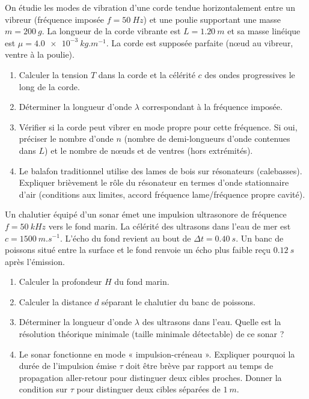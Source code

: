 \documentclass[11pt]{article}
\begin{document}
\begin{exercice}
On étudie les modes de vibration d'une corde tendue horizontalement entre un vibreur (fréquence imposée $f = \SI{50}{Hz}$) et une poulie supportant une masse $m = \SI{200}{g}$. La longueur de la corde vibrante est $L = \SI{1,20}{m}$ et sa masse linéique est $\mu = \SI{4,0e-3}{kg.m^{-1}}$. La corde est supposée parfaite (nœud au vibreur, ventre à la poulie).
\begin{enumerate}
    \item Calculer la tension $T$ dans la corde et la célérité $c$ des ondes progressives le long de la corde.
    \item Déterminer la longueur d'onde $\lambda$ correspondant à la fréquence imposée.
    \item Vérifier si la corde peut vibrer en mode propre pour cette fréquence. Si oui, préciser le nombre d'onde $n$ (nombre de demi-longueurs d'onde contenues dans $L$) et le nombre de nœuds et de ventres (hors extrémités).
    \item Le balafon traditionnel utilise des lames de bois sur résonateurs (calebasses). Expliquer brièvement le rôle du résonateur en termes d'onde stationnaire d'air (conditions aux limites, accord fréquence lame/fréquence propre cavité).
\end{enumerate}
\end{exercice}

\begin{exercice}
Un chalutier équipé d'un sonar émet une impulsion ultrasonore de fréquence $f = \SI{50}{kHz}$ vers le fond marin. La célérité des ultrasons dans l'eau de mer est $c = \SI{1500}{m.s^{-1}}$. L'écho du fond revient au bout de $\Delta t = \SI{0,40}{s}$. Un banc de poissons situé entre la surface et le fond renvoie un écho plus faible reçu $\SI{0,12}{s}$ après l'émission.
\begin{enumerate}
    \item Calculer la profondeur $H$ du fond marin.
    \item Calculer la distance $d$ séparant le chalutier du banc de poissons.
    \item Déterminer la longueur d'onde $\lambda$ des ultrasons dans l'eau. Quelle est la résolution théorique minimale (taille minimale détectable) de ce sonar ?
    \item Le sonar fonctionne en mode « impulsion-créneau ». Expliquer pourquoi la durée de l'impulsion émise $\tau$ doit être brève par rapport au temps de propagation aller-retour pour distinguer deux cibles proches. Donner la condition sur $\tau$ pour distinguer deux cibles séparées de $\SI{1}{m}$.
\end{enumerate}
\end{exercice}
\end{document}
